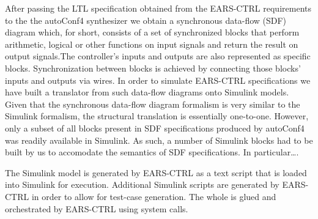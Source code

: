 After passing the LTL specification obtained from the \textsf{EARS-CTRL}
requirements to the the \textsf{autoConf4} synthesizer we obtain a
synchronous data-flow (SDF) diagram which, for short, consists of a set of
synchronized blocks that perform arithmetic, logical or other functions on
input signals and return the result on output signals.The controller's inputs
and outputs are also represented as specific blocks. Synchronization between
blocks is achieved by connecting those blocks' inputs and outputs via wires.
In order to simulate \textsf{EARS-CTRL} specifications we have built a
translator from such data-flow diagrams onto Simulink models. Given that the
synchronous data-flow diagram formalism is very similar to the Simulink
formalism, the structural translation is essentially one-to-one. However, only a
subset of all blocks present in SDF specifications produced by
\textsf{autoConf4} was readily available in Simulink. As such, a number of
Simulink blocks had to be built by us to accomodate the semantics of SDF
specifications. In particular\ldots{}. 

The Simulink model is generated by \textsf{EARS-CTRL} as a text script that is
loaded into Simulink for execution. Additional Simulink scripts are generated
by \textsf{EARS-CTRL} in order to allow for test-case generation. The whole is
glued and orchestrated by \textsf{EARS-CTRL} using system calls.
